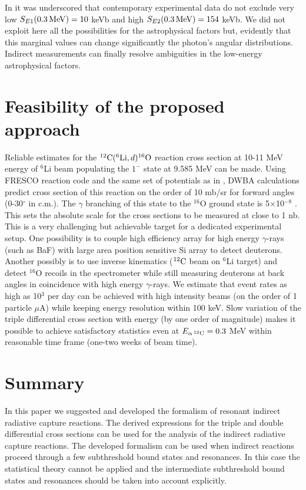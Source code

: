 \documentclass[prl,unsortedaddress,groupedaddress,twocolumn,amsmath,amsfonts,amssymb,showpacs,floatfix,nofootinbib]{revtex4}
\begin{document}
In \cite{gai2015} it was underscored that contemporary experimental data do not exclude 
very low $S_{E1}(0.3\,{\rm MeV})=10$ keVb and high $S_{E2}(0.3\,{\rm MeV})=154$ keVb. We did not exploit here all the possibilities for the astrophysical factors but, evidently that this marginal values can change significantly the photon's angular distributions. Indirect measurements can finally resolve ambiguities in the low-energy astrophysical factors.

\section{Feasibility of the proposed approach}

Reliable estimates for the $^{12}{\rm C}({}^{6}{\rm Li},d){}^{16}{\rm O}$ reaction cross section at 10-11 MeV energy of $^6$Li beam populating the $1^-$ state at 9.585 MeV can be made. Using FRESCO  reaction code \cite{fresco} and the same set of potentials as in \cite{avila}, DWBA calculations predict cross section of this reaction on the order of 10 mb/sr for forward angles (0-30$^\circ$ in c.m.). The  $\gamma$ branching of this state to the $^{16}$O ground state is 5$\times$10$^{-8}$ \cite{tiley}. This sets the absolute scale for the cross sections to be measured at close to 1 nb. This is a very challenging but achievable target for a dedicated experimental setup. One possibility is to couple high efficiency array for high energy $\gamma$-rays (such as BaF) with large area position sensitive Si array to detect deuterons. Another possibly is to use inverse kinematics ($^{12}{\rm C}$ beam on $^6$Li target) and detect $^{16}$O recoils in the spectrometer while still measuring deuterons at back angles in coincidence with high energy $\gamma$-rays. We estimate that event rates as high as 10$^3$ per day can be achieved with high intensity beams (on the order of 1 particle $\mu$A) while keeping energy resolution within 100 keV. Slow variation of the triple differential cross section with energy (by one order of magnitude) makes it possible to achieve satisfactory statistics even at $E_{\alpha\,^{12}{\rm C}} = 0.3$ MeV within reasonable time frame (one-two weeks of beam time).

\section{Summary}

In this paper we suggested and developed the formalism of resonant indirect radiative capture reactions. The derived expressions for the triple and double differential cross sections   
can be used for the analysis of the indirect radiative capture reactions. The developed formalism can be used when indirect reactions proceed through a few subthreshold bound states and resonances. In this case the statistical theory cannot be applied and the intermediate subthreshold bound states and resonances should be taken into account explicitly. 
\end{document}
